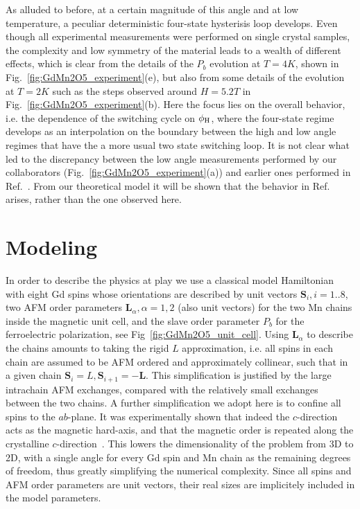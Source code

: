 As alluded to before, at a certain magnitude of this angle and at low temperature, a peculiar deterministic four-state hysterisis loop develops.
Even though all experimental measurements were performed on single crystal samples, the complexity and low symmetry of the material leads to a wealth of different effects, which is clear from the details of the $P_b$ evolution at $T=4K$, shown in Fig.~\ref{fig:GdMn2O5_experiment}(e), but also from some details of the evolution at $T=2K$ such as the steps observed around $H=5.2T$ in Fig.~\ref{fig:GdMn2O5_experiment}(b).
Here the focus lies on the overall behavior, i.e. the dependence of the switching cycle on $\phi_{\rm H}$, where the four-state regime develops as an interpolation on the boundary between the high and low angle regimes that have the a more usual two state switching loop.
It is not clear what led to the discrepancy between the low angle measurements performed by our collaborators (Fig.~\ref{fig:GdMn2O5_experiment}(a)) and earlier ones performed in Ref.~\cite{Lee13}.
From our theoretical model it will be shown that the behavior in Ref.~\cite{Lee13} arises, rather than the one observed here.

\section{Modeling}
In order to describe the physics at play we use a classical model Hamiltonian with eight Gd spins whose orientations are described by unit vectors $\mathbf{S}_i, i=1..8$, two AFM order parameters $\mathbf{L}_\alpha, \alpha=1,2$ (also unit vectors) for the two Mn chains inside the magnetic unit cell, and the slave order parameter $P_b$ for the ferroelectric polarization, see Fig~\ref{fig:GdMn2O5_unit_cell}.
Using $\mathbf{L}_\alpha$ to describe the chains amounts to taking the rigid $L$ approximation, i.e. all spins in each chain are assumed to be AFM ordered and approximately collinear, such that in a given chain $\mathbf{S}_i = L, \mathbf{S}_{i+1} = - \mathbf{L}$. This simplification is justified by the large intrachain AFM exchanges, compared with the relatively small exchanges between the two chains.
A further simplification we adopt here is to confine all spins to the $ab$-plane. It was experimentally shown that indeed the $c$-direction acts as the magnetic hard-axis, and that the magnetic order is repeated along the crystalline $c$-direction~\cite{Lee13}.
This lowers the dimensionality of the problem from 3D to 2D, with a single angle for every Gd spin and Mn chain as the remaining degrees of freedom, thus greatly simplifying the numerical complexity.
Since all spins and AFM order parameters are unit vectors, their real sizes are implicitely included in the model parameters.


